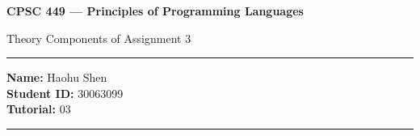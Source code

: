 \documentclass[11pt]{article}
\theoremstyle{definition}
\begin{document}
\begin{center}
{\bf \Large CPSC 449 --- Principles of Programming Languages

Theory Components of Assignment 3}
\end{center}

\newenvironment{titlemize}[1]{%
  \paragraph{#1}
  \begin{itemize}}
  {\end{itemize}}
  
\hrule 	

\textbf{Name:} Haohu Shen \\
\textbf{Student ID:} 30063099 \\
\textbf{Tutorial:} 03 

\medskip \hrule
\end{document}
